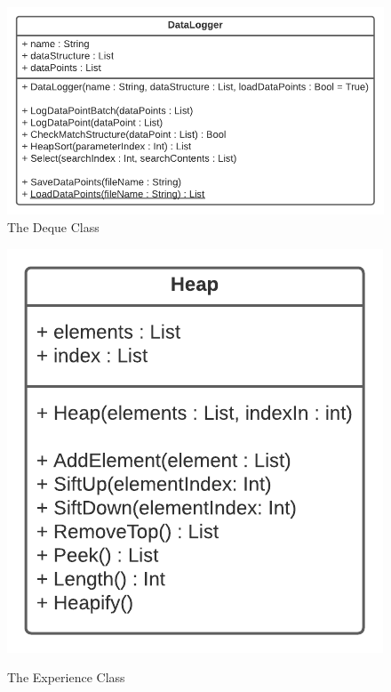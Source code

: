 \begin{flushleft}
                \begin{figure}[H]
                    \centering
                    \includegraphics[width=.75\textwidth]{Images/Design/Classes/DataLogger.png}
                    \caption*{The Deque Class}
                \end{figure}
                \begin{figure}[H]
                    \centering
                    \includegraphics[width=.45\textwidth]{Images/Design/Classes/Heap.png}  \\
                    \caption*{The Experience Class}
                \end{figure}


\end{flushleft}
